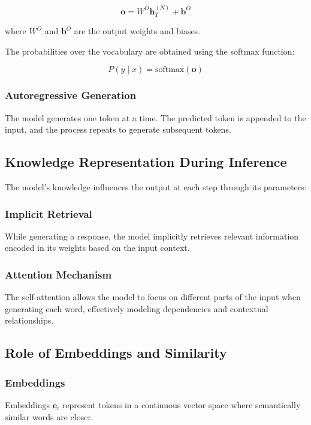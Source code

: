 \documentclass[12pt]{article}
\begin{document}
\[
\mathbf{o} = W^O \mathbf{h}_T^{(N)} + \mathbf{b}^O
\]

where \( W^O \) and \( \mathbf{b}^O \) are the output weights and biases.

The probabilities over the vocabulary are obtained using the softmax function:

\[
P(y \mid x) = \text{softmax}(\mathbf{o})
\]

\subsubsection{Autoregressive Generation}

The model generates one token at a time. The predicted token is appended to the input, and the process repeats to generate subsequent tokens.

\subsection{Knowledge Representation During Inference}

The model's knowledge influences the output at each step through its parameters:

\subsubsection{Implicit Retrieval}

While generating a response, the model implicitly retrieves relevant information encoded in its weights based on the input context.

\subsubsection{Attention Mechanism}

The self-attention allows the model to focus on different parts of the input when generating each word, effectively modeling dependencies and contextual relationships.

\subsection{Role of Embeddings and Similarity}

\subsubsection{Embeddings}

Embeddings \( \mathbf{e}_i \) represent tokens in a continuous vector space where semantically similar words are closer.
\end{document}
